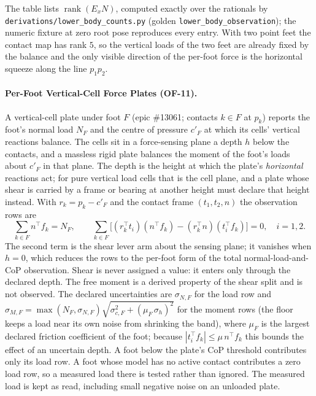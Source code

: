 \documentclass[11pt,a4paper]{article}
\newcommand{\rank}{\operatorname{rank}}
\begin{document}
The table lists $\rank(E_xN)$, computed exactly over the rationals by
\texttt{derivations/lower\_body\_counts.py} (golden
\texttt{lower\_body\_observation}); the numeric fixture at zero root pose
reproduces every entry.  With two point feet the contact map has rank $5$, so
the vertical loads of the two feet are already fixed by the balance and the
only visible direction of the per-foot force is the horizontal squeeze along
the line $p_1p_2$.

\paragraph{Per-Foot Vertical-Cell Force Plates (OF-11).}
A vertical-cell plate under foot $F$ (epic \#13061; contacts $k\in F$ at
$p_k$) reports the foot's normal load $N_F$ and the centre of pressure $c'_F$
at which its cells' vertical reactions balance.  The cells sit in a
force-sensing plane a depth $h$ below the contacts, and a massless rigid plate
balances the moment of the foot's loads about $c'_F$ in that plane.  The depth
is the height at which the plate's \emph{horizontal} reactions act; for pure
vertical load cells that is the cell plane, and a plate whose shear is carried
by a frame or bearing at another height must declare that height instead.  With
$r_k=p_k-c'_F$ and the contact frame $(t_1,t_2,n)$ the observation rows are
\begin{equation}
\sum_{k\in F} n^{\top}f_k=N_F,\qquad
\sum_{k\in F}\bigl[(r_k^{\top}t_i)(n^{\top}f_k)-(r_k^{\top}n)(t_i^{\top}f_k)\bigr]=0,
\quad i=1,2 .
\label{eq:vertical_plate}
\end{equation}
The second term is the shear lever arm about the sensing plane; it vanishes
when $h=0$, which reduces the rows to the per-foot form of the total
normal-load-and-CoP observation.  Shear is never assigned a value: it enters
only through the declared depth.  The free moment is a derived property of the
shear split and is not observed.  The declared uncertainties are $\sigma_{N,F}$
for the load row and
$\sigma_{M,F}=\max(N_F,\sigma_{N,F})\sqrt{\sigma_{c,F}^2+(\mu_F\,\sigma_h)^2}$
for the moment rows (the floor keeps a load near its own noise from
shrinking the band), where $\mu_F$ is the largest declared friction coefficient of the foot;
because $|t_i^{\top}f_k|\le\mu\,n^{\top}f_k$ this bounds the effect of an
uncertain depth.  A foot below the plate's CoP threshold contributes only its
load row.  A foot whose model has no active contact contributes a zero load
row, so a measured load there is tested rather than ignored.  The measured
load is kept as read, including small negative noise on an unloaded plate.
\end{document}
